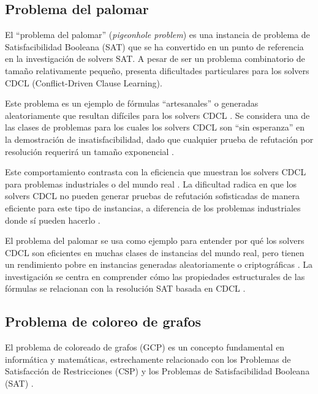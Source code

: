 \subsection{Problema del palomar}
\label{subsec:pingeonhole}
El ``problema del palomar'' (\textit{pigeonhole problem}) es una instancia de problema de Satisfacibilidad Booleana (SAT) que se ha convertido en un punto de referencia en la investigación de solvers SAT. A pesar de ser un problema combinatorio de tamaño relativamente pequeño, presenta dificultades particulares para los solvers CDCL (Conflict-Driven Clause Learning).

Este problema es un ejemplo de fórmulas “artesanales” o generadas aleatoriamente que resultan difíciles para los solvers CDCL \cite{zulkoski2018understanding}. %
Se considera una de las clases de problemas para los cuales los solvers CDCL son ``sin esperanza'' en la demostración de insatisfacibilidad, dado que cualquier prueba de refutación por resolución requerirá un tamaño exponencial \cite{oh2016improving}. %

Este comportamiento contrasta con la eficiencia que muestran los solvers CDCL para problemas industriales o del mundo real \cite{zulkoski2018understanding}. %
La dificultad radica en que los solvers CDCL no pueden generar pruebas de refutación sofisticadas de manera eficiente para este tipo de instancias, a diferencia de los problemas industriales donde sí pueden hacerlo \cite{oh2016improving}. %

El problema del palomar se usa como ejemplo para entender por qué los solvers CDCL son eficientes en muchas clases de instancias del mundo real, pero tienen un rendimiento pobre en instancias generadas aleatoriamente o criptográficas \cite{ganesh_unreasonable}. %
La investigación se centra en comprender cómo las propiedades estructurales de las fórmulas se relacionan con la resolución SAT basada en CDCL \cite{zulkoski2018understanding}. %

\subsection{Problema de coloreo de grafos}
\label{subsec:graph-coloring}
El problema de coloreado de grafos (GCP) es un concepto fundamental en informática y matemáticas, estrechamente relacionado con los Problemas de Satisfacción de Restricciones (CSP) y los Problemas de Satisfacibilidad Booleana (SAT) \cite{almabetterCSP}. %

